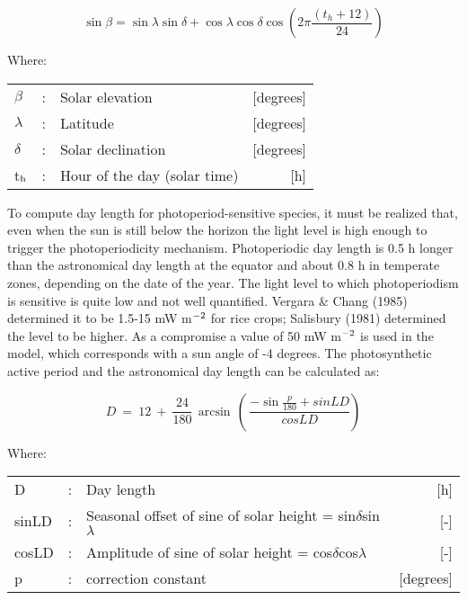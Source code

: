 \begin{equation}
\label{eq:SolarElevation}
\sin \beta = \sin \lambda \sin \delta + \cos \lambda \cos \delta \cos (2 \pi {\frac{(t _{h} +12)}{24}} )
\end{equation}

Where:\\[5pt]
\begin{tabularx}{\textwidth}{llXr}
	$\beta$ &:& Solar elevation  & [degrees]\\
	$\lambda$ &:& Latitude  & [degrees]\\
	$\delta$ &:& Solar declination  & [degrees]\\
	t$_{{\rm h}}$ &:& Hour of the day (solar time)  & [h]\\
\end{tabularx}

To compute day length for photoperiod-sensitive species, it must be realized that, even
when the sun is still below the horizon the light level is high enough to trigger the
photoperiodicity mechan\-ism. Photoperiodic day length is 0.5 h longer than the 
astronomi\-cal day length at the equator and about 0.8 h in temperate zones, depending 
on the date of the year. The light level to which photoperiodism is sensitive is quite low and not well
quantified. Vergara \& Chang (1985) determined it to be 1.5-15 mW m$^{{\rm -2}}$ for 
rice crops; Salisbury (1981) determined the level to be higher. As a compromise a value of 50 mW
m$^{{\rm -2}}$ is used in the model, which corresponds with a sun angle of -4 degrees. The
photosynthetic active period and the astro\-nomical day length can be calculated as:

\begin{equation}
\label{eq:AstroDaylength}
D ~=~ 12~+~{\frac{24}{180}} \, \arcsin \, (\,{\frac{-\sin {\frac{p}{180}} + sinLD}{cosLD}} )
\end{equation}

Where:\\[5pt]
\begin{tabularx}{\textwidth}{llXr}
	D &:& Day length  & [h]\\
	sinLD &:& Seasonal offset of sine of solar height = sin$\delta$sin$\lambda$  & [-]\\
	cosLD &:& Amplitude of sine of solar height = cos$\delta$cos$\lambda$  & [-]\\
	p &:& correction constant  & [degrees]\\
\end{tabularx}

